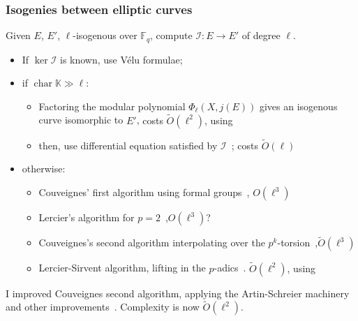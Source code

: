 \documentclass[10pt]{beamer}
\DeclareMathOperator{\car}{char}  %
\newcommand{\K}{\mathbb{K}}  %
\newcommand{\F}{\mathbb{F}}  %
\newcommand{\0}{\mathcal{O}}  %
\newcommand{\isog}[1]{\mathcal{#1}}  %
\newcommand{\I}{\isog{I}}  %
\newcommand{\tildO}{\tilde{O}}  %
\begin{document}
\begin{frame}
  \frametitle{Isogenies between elliptic curves} 

  \begin{center}
    Given $E$, $E'$, $\ell$-isogenous over $\F_q$, compute $\I:E\to
    E'$ of degree $\ell$.
  \end{center}

  \begin{itemize}
  \item If $\ker\I$ is known, use Vélu formulae;
  \item if $\car\K\gg\ell$:
    \begin{itemize}
    \item Factoring the modular polynomial $\Phi_\ell(X,j(E))$ gives
      an isogenous curve isomorphic to $E'$, \hfill\alert{costs
        $\tildO(\ell^2)$, using \cite{sutherland10:modpol}}
    \item then, use differential equation satisfied by
      $\I$~\cite{elkies98,bostan+morain+salvy+schost08};
      \hfill\alert{costs $\tildO(\ell)$}
    \end{itemize}
  \item otherwise:
    \begin{itemize}
    \item Couveignes' first algorithm using formal groups~\cite{couveignes94},
      \hfill\alert{$O(\ell^3)$}
    \item Lercier's algorithm for
      $p=2$~\cite{lercier96},\hfill\alert{$O(\ell^3)$?}
    \item Couveignes's second algorithm interpolating over the
      $p^k$-torsion~\cite{couveignes96},\hfill\alert{$\tildO(\ell^3)$}
    \item Lercier-Sirvent algorithm, lifting in the
      $p$-adics~\cite{lercier+sirvent08}.\hfill 
      \alert{$\tildO(\ell^2)$, using \cite{sutherland10:modpol}}
    \end{itemize}
  \end{itemize}

  \begin{center}
    I improved Couveignes second algorithm, applying the
    Artin-Schreier machinery and other improvements~\cite{df10}.
    Complexity is now \alert{$\tildO(\ell^2)$}.
  \end{center}
\end{frame}

\end{document}
